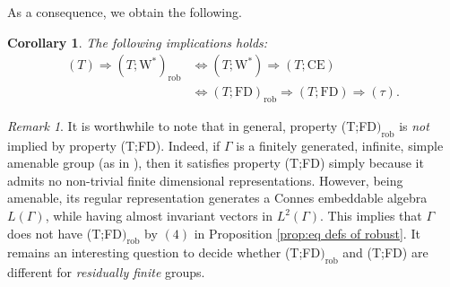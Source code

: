 \documentclass[11pt]{amsart}
\newcommand{\bM}{{\mathbf{M}}}
\newtheorem{corollary}[theorem]{Corollary}
\newtheorem{proposition}[theorem]{Proposition}
\theoremstyle{definition}
\theoremstyle{remark}
\newtheorem{remark}[theorem]{Remark}
\theoremstyle{definition}
\begin{document}
As a consequence, we obtain the following.
\begin{corollary}\label{cor:eq defs of robust}
The following implications holds:
\begin{align*}
        (T)\Longrightarrow (T;\mathrm{W}^*)_{\mathrm{rob}}&\iff (T;\mathrm{W}^*)\Longrightarrow(T;\mathrm{CE})\\ &\iff (T;\mathrm{FD})_{\mathrm{rob}}
        \Longrightarrow (T;\mathrm{FD})\Longrightarrow (\tau).
\end{align*}
\end{corollary}
\begin{remark}\label{rem:JM}
    It is worthwhile to note that in general, property (T;FD$)_{\mathrm{rob}}$ is \emph{not} implied by property (T;FD). 
    Indeed, if $\Gamma$ is a finitely generated, infinite, simple amenable group (as in \cite{JM}), then it  satisfies property (T;FD) simply because it admits no non-trivial finite dimensional representations.
    However, being amenable, its regular representation generates a Connes embeddable algebra $L(\Gamma)$, while having almost invariant vectors in $L^2(\Gamma)$. This implies that $\Gamma$ does not have (T;FD$)_{\mathrm{rob}}$ by $(4)$ in Proposition \ref{prop:eq defs of robust}.
    It remains an interesting question to decide whether (T;FD$)_{\mathrm{rob}}$ and (T;FD) are different for \emph{residually finite} groups. \end{remark}


    
\end{document}
